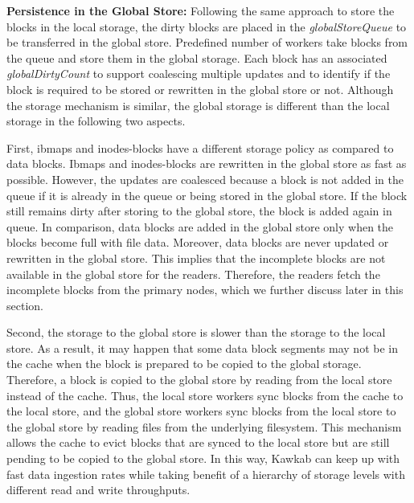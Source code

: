 \documentclass[]{article}
\newcommand{\subtopic}[1]{\vspace{1.5pt} \noindent \textbf{#1}}
\begin{document}
\subtopic{Persistence in the Global Store:} Following the same approach to
store the blocks in the local storage, the dirty blocks are placed in the
\textit{globalStoreQueue} to be transferred in the global store. Predefined
number of workers take blocks from the queue and store them in the
global storage. Each block has an associated \textit{globalDirtyCount}
to support coalescing multiple updates and to identify if the block
is required to be stored or rewritten in the global store or not.
Although the storage mechanism is similar, the global storage is different 
than the local storage in the following two aspects.

First, ibmaps and inodes-blocks have a different storage policy as compared to
data blocks. Ibmaps and inodes-blocks are rewritten in the global store as fast
as possible. However, the updates are coalesced because a block is not added in
the queue if it is already in the queue or being stored in the global store. If
the block still remains dirty after storing to the global store, the block is
added again in queue. In comparison, data blocks are added in the global store
only when the blocks become full with file data.  Moreover, data blocks are
never updated or rewritten in the global store.  This implies that the
incomplete blocks are not available in the global store for the readers.
Therefore, the readers fetch the incomplete blocks from the primary nodes,
which we further discuss later in this section.

Second, the storage to the global store is slower than the storage to the local
store. As a result, it may happen that some data block segments may not be in
the cache when the block is prepared to be copied to the global storage.
Therefore, a block is copied to the global store by reading from the local
store instead of the cache. Thus, the local store workers sync blocks from the
cache to the local store, and the global store workers sync blocks from the
local store to the global store by reading files from the underlying
filesystem. This mechanism allows the cache to evict blocks that are synced to
the local store but are still pending to be copied to the global store.  In
this way, Kawkab can keep up with fast data ingestion rates while taking
benefit of a hierarchy of storage levels with different read and write
throughputs. 
\end{document}
